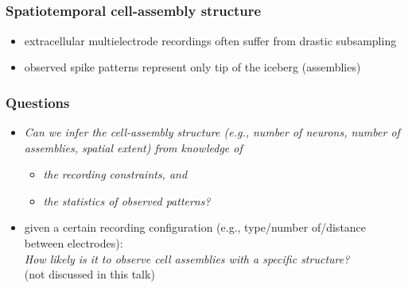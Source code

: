 \documentclass[8pt,t,usepdftitle=false]{beamer}
\begin{document}
\subsection{\sttl}
\begin{frame}[plain]
  \frametitle{Spatiotemporal cell-assembly structure}
  \begin{itemize}
  \item<1-> extracellular multielectrode recordings often suffer from drastic subsampling
  \item<1-> observed spike patterns represent only tip of the iceberg (assemblies)
  \end{itemize}
  \vspace*{1ex}
\end{frame}
\begin{frame}[plain]
  \frametitle{Questions}
  \begin{itemize}
  \item<1-> \emph{Can we infer the cell-assembly structure (e.g., number of neurons, number of assemblies, spatial extent) from knowledge of}
      \begin{itemize}
      \item \emph{the recording constraints, and}
        \item \emph{the statistics of observed patterns?}\\[2ex]
      \end{itemize}
  \item<2-> given a certain recording configuration (e.g., type/number of/distance between electrodes):\\
    \emph{How likely is it to observe cell assemblies with a specific structure?}\\
    (not discussed in this talk)
  \end{itemize}
\end{frame}
\end{document}
